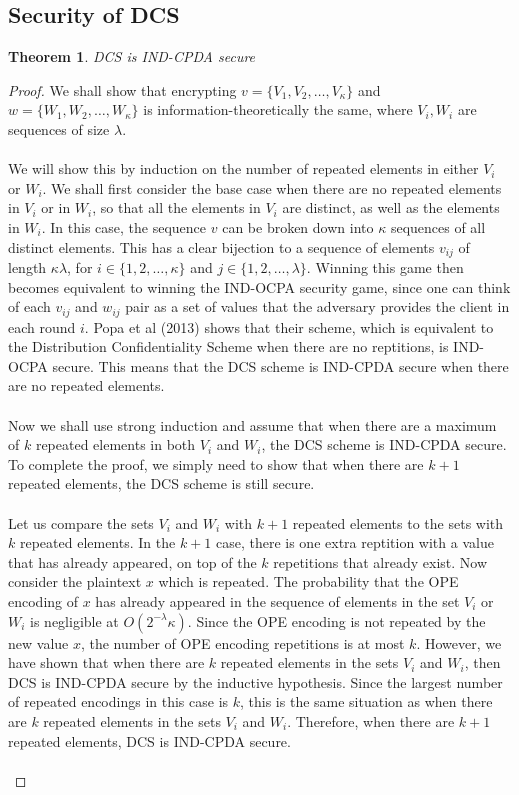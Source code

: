 \documentclass[12pt]{article}
\newtheorem{theorem}{Theorem}[section]
\begin{document}
\subsection{Security of DCS}
\begin{theorem}
  DCS is IND-CPDA secure 
\end{theorem}
\begin{proof}
We shall show that encrypting $v = \{V_1, V_2, \ldots, V_{\kappa} \}$ and $w = \{W_1, W_2, \ldots, W_{\kappa}\}$ is information-theoretically the same, where $V_i, W_i$ are sequences of size $\lambda$. \\ \\
We will show this by induction on the number of repeated elements in either $V_i$ or $W_i$. We shall first consider the base case when there are no repeated elements in $V_i$ or in $W_i$, so that all the elements in $V_i$ are distinct, as well as the elements in $W_i$. In this case, the sequence $v$ can be broken down into $\kappa$ sequences of all distinct elements. This has a clear bijection to a sequence of elements $v_{ij}$ of length $\kappa \lambda$, for $i \in \{1, 2, \ldots, \kappa\}$ and $j \in \{1, 2, \ldots, \lambda \}$. Winning this game then becomes equivalent to winning the IND-OCPA security game, since one can think of each $v_{ij}$ and $w_{ij}$ pair as a set of values that the adversary provides the client in each round $i$. Popa et al (2013) shows that their scheme, which is equivalent to the Distribution Confidentiality Scheme when there are no reptitions, is IND-OCPA secure. This means that the DCS scheme is IND-CPDA secure when there are no repeated elements. \\ \\
Now we shall use strong induction and assume that when there are a maximum of $k$ repeated elements in both $V_i$ and $W_i$, the DCS scheme is IND-CPDA secure. To complete the proof, we simply need to show that when there are $k+1$ repeated elements, the DCS scheme is still secure. \\ \\
Let us compare the sets $V_i$ and $W_i$ with $k+1$ repeated elements to the sets with $k$ repeated elements. In the $k+1$ case, there is one extra reptition with a value that has already appeared, on top of the $k$ repetitions that already exist. Now consider the plaintext $x$ which is repeated. The probability that the OPE encoding of $x$ has already appeared in the sequence of elements in the set $V_i$ or $W_i$ is negligible at $O(2^{-\lambda} \kappa)$. Since the OPE encoding is not repeated by the new value $x$, the number of OPE encoding repetitions is at most $k$. However, we have shown that when there are $k$ repeated elements in the sets $V_i$ and $W_i$, then DCS is IND-CPDA secure by the inductive hypothesis. Since the largest number of repeated encodings in this case is $k$, this is the same situation as when there are $k$ repeated elements in the sets $V_i$ and $W_i$. Therefore, when there are $k+1$ repeated elements, DCS is IND-CPDA secure. \\ \\

\end{proof}
\end{document}

